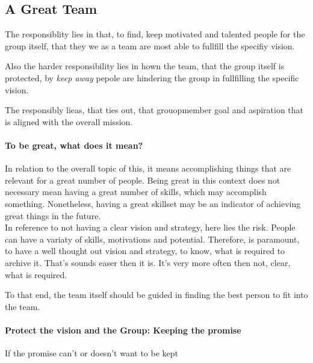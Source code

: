 \subsection{A Great Team} \label{responsibility__great}
The responsiblity lies in that, to find, keep motivated and talented people for the group itself, that they we as a team are most able to fullfill the specifiy vision.

Also the harder responsibility lies in hown the team, that the group itself is protected, by \textit{keep away} pepole are hindering the group in fullfilling the specific vision.

The responsibly lieas, that ties out, that grouopmember goal and aspiration that is aligned with the overall mission. 

\paragraph{To be great, what does it mean?}
In relation to the overall topic of this, it means accomplishing things that are relevant for a great number of people.
Being great in this context does not necessary mean having a great number of skills, which may accomplish something. Nonetheless, having a great skillset may be an indicator of achieving great things in the future.\\

In reference to not having a clear vision and strategy, here lies the risk. People can have a variaty of skills, motivations and potential. Therefore, is paramount, to have a well thought out vision and strategy, to know, what is required to archive it. That's sounds easer then it is. It's very more often then not, clear, what is required.

To that end, the team itself should be guided in finding the best person to fit into the team.

\paragraph{Protect the vision and the Group: Keeping the promise}

\begin{center}
	If the promise can't or doesn't want to be kept
\end{center}

